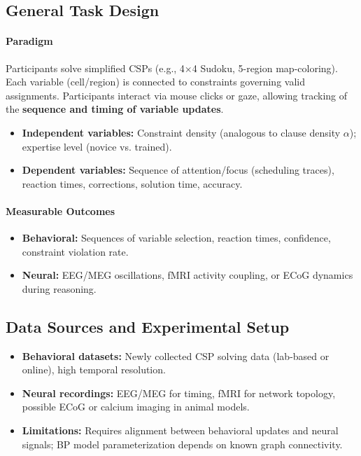     \subsection{General Task Design}
        
        \paragraph{Paradigm}
            Participants solve simplified CSPs (e.g., 4×4 Sudoku, 5-region map-coloring).  
            Each variable (cell/region) is connected to constraints governing valid assignments.  
            Participants interact via mouse clicks or gaze, allowing tracking of the \textbf{sequence and timing of variable updates}.
            
            \begin{itemize}
                \item \textbf{Independent variables:} Constraint density (analogous to clause density $\alpha$); expertise level (novice vs. trained).
                \item \textbf{Dependent variables:} Sequence of attention/focus (scheduling traces), reaction times, corrections, solution time, accuracy.
            \end{itemize}
    
        \paragraph{Measurable Outcomes}
            \begin{itemize}
                \item \textbf{Behavioral:} Sequences of variable selection, reaction times, confidence, constraint violation rate.
                \item \textbf{Neural:} EEG/MEG oscillations, fMRI activity coupling, or ECoG dynamics during reasoning.
            \end{itemize}
    
    \subsection{Data Sources and Experimental Setup}
        \begin{itemize}
            \item \textbf{Behavioral datasets:} Newly collected CSP solving data (lab-based or online), high temporal resolution.
            \item \textbf{Neural recordings:} EEG/MEG for timing, fMRI for network topology, possible ECoG or calcium imaging in animal models.
            \item \textbf{Limitations:} Requires alignment between behavioral updates and neural signals; BP model parameterization depends on known graph connectivity.
        \end{itemize}
    

